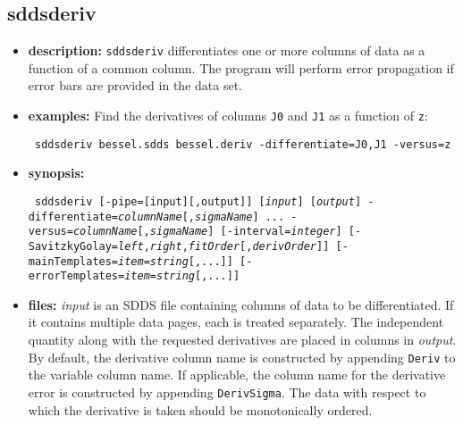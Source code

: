 \newpage
\subsection{sddsderiv}
\label{sddsderiv}

\begin{itemize}
\item {\bf description:}
{\tt sddsderiv} differentiates one or more columns of data as a function of a common
column.  The program will perform error propagation if error bars are provided in 
the data set.
\item {\bf examples:} 
Find the derivatives of columns {\tt J0} and {\tt J1} as a function of {\tt z}:
\begin{flushleft}{\tt
sddsderiv bessel.sdds bessel.deriv -differentiate=J0,J1 -versus=z
}\end{flushleft}
\item {\bf synopsis:} 
\begin{flushleft}{\tt
sddsderiv [-pipe=[input][,output]] [{\em input}] [{\em output}]
-differentiate={\em columnName}[,{\em sigmaName}] ...
-versus={\em columnName}[,{\em sigmaName}] [-interval={\em integer}]
[-SavitzkyGolay={\em left},{\em right},{\em fitOrder}[,{\em derivOrder}]]
[-mainTemplates={\em item}={\em string}[,...]] 
[-errorTemplates={\em item}={\em string}[,...]] 
}\end{flushleft}
\item {\bf files:}
{\em input} is an SDDS file containing columns of data to be
differentiated.  If it contains multiple data pages, each is treated
separately. The independent quantity along with the requested derivatives
are placed in columns in {\em output}.  By default, the
derivative column name is constructed by appending {\tt Deriv} to the
variable column name.  If applicable, the column name for the
derivative error is constructed by appending {\tt DerivSigma}.  The data with
respect to which the derivative is taken should be monotonically ordered.


\end{itemize}
